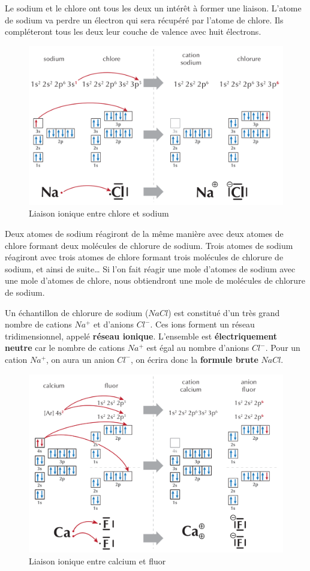 \documentclass[
  11pt,
  french,
  a4paper,
  openany]{book}
\begin{document}
Le sodium et le chlore ont tous les deux un intérêt à former une liaison. L'atome de sodium va perdre un électron qui sera récupéré par l'atome de chlore. Ils compléteront tous les deux leur couche de valence avec huit électrons.

\begin{figure}

{\centering \includegraphics[width=0.6\linewidth]{images/NaCl-diagram} 

}

\caption{Liaison ionique entre chlore et sodium}\label{fig:NaCl-diagram}
\end{figure}

Deux atomes de sodium réagiront de la même manière avec deux atomes de chlore formant deux molécules de chlorure de sodium. Trois atomes de sodium réagiront avec trois atomes de chlore formant trois molécules de chlorure de sodium, et ainsi de suite\ldots{} Si l'on fait réagir une mole d'atomes de sodium avec une mole d'atomes de chlore, nous obtiendront une mole de molécules de chlorure de sodium.

Un échantillon de chlorure de sodium (\(NaCl\)) est constitué d'un très grand nombre de cations \(Na^+\) et d'anions \(Cl^-\). Ces ions forment un réseau tridimensionnel, appelé \textbf{réseau ionique}. L'ensemble est \textbf{électriquement neutre} car le nombre de cations \(Na^+\) est égal au nombre d'anions \(Cl^-\). Pour un cation \(Na^+\), on aura un anion \(Cl^-\), on écrira donc la \textbf{formule brute} \(NaCl\).

\newpage

\begin{figure}

{\centering \includegraphics[width=0.6\linewidth]{images/CaF2-diagram} 

}

\caption{Liaison ionique entre calcium et fluor}\label{fig:CaF2-diagram}
\end{figure}
\end{document}
